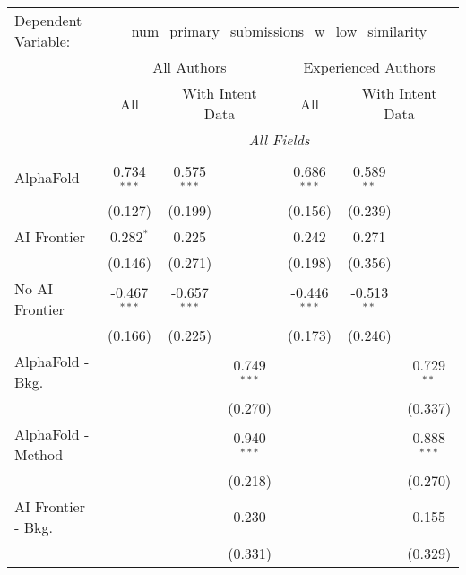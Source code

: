 \begingroup
\centering
\begin{tabular}{lcccccc}
   \tabularnewline \midrule \midrule
   Dependent Variable: & \multicolumn{6}{c}{num\_primary\_submissions\_w\_low\_similarity}\\
 & \multicolumn{3}{c}{All Authors} & \multicolumn{3}{c}{Experienced Authors} \\
\cmidrule(lr){2-4} \cmidrule(lr){5-7}
 & \multicolumn{1}{c}{All} & \multicolumn{2}{c}{With Intent Data} & \multicolumn{1}{c}{All} & \multicolumn{2}{c}{With Intent Data} \\
\cmidrule(lr){2-2} \cmidrule(lr){3-4} \cmidrule(lr){5-5} \cmidrule(lr){6-7}
 & \multicolumn{6}{c}{\textit{All Fields}} \\ \\
   AlphaFold               & 0.734$^{***}$  & 0.575$^{***}$  &               & 0.686$^{***}$  & 0.589$^{**}$  &   \\   
                           & (0.127)        & (0.199)        &               & (0.156)        & (0.239)       &   \\   
   AI Frontier             & 0.282$^{*}$    & 0.225          &               & 0.242          & 0.271         &   \\   
                           & (0.146)        & (0.271)        &               & (0.198)        & (0.356)       &   \\   
   No AI Frontier          & -0.467$^{***}$ & -0.657$^{***}$ &               & -0.446$^{***}$ & -0.513$^{**}$ &   \\   
                           & (0.166)        & (0.225)        &               & (0.173)        & (0.246)       &   \\   
   AlphaFold - Bkg.        &                &                & 0.749$^{***}$ &                &               & 0.729$^{**}$\\   
                           &                &                & (0.270)       &                &               & (0.337)\\   
   AlphaFold - Method      &                &                & 0.940$^{***}$ &                &               & 0.888$^{***}$\\   
                           &                &                & (0.218)       &                &               & (0.270)\\   
   AI Frontier - Bkg.      &                &                & 0.230         &                &               & 0.155\\   
                           &                &                & (0.331)       &                &               & (0.329)\\   

\end{tabular}
